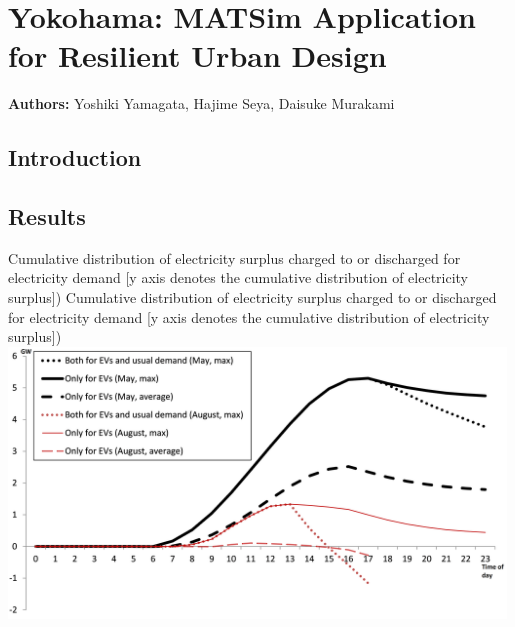 \chapter{Yokohama: MATSim Application for Resilient Urban Design}
\label{ch:yokohama}
\hfill \textbf{Authors:} Yoshiki Yamagata, Hajime Seya, Daisuke Murakami

\section{Introduction}

\section{Results}


\createfigure%
{Cumulative distribution of electricity surplus charged to or discharged for electricity demand [y axis denotes the cumulative distribution of electricity surplus])}%
{Cumulative distribution of electricity surplus charged to or discharged for electricity demand [y axis denotes the cumulative distribution of electricity surplus])}%
{\label{fig:yokohama_fig1}}%
{\includegraphics[width=0.99\textwidth, angle=0]{./scenarios/figures/yokohama_fig1.png}}%
{}


